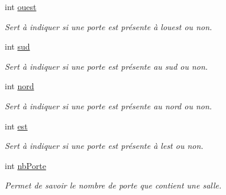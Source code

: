 \begin{DoxyCompactItemize}
\item 
\mbox{\label{structSalle_aa89ea230128f1edda9a1219cde40c861}} 
int \hyperlink{structSalle_aa89ea230128f1edda9a1219cde40c861}{ouest}
\begin{DoxyCompactList}\small\item\em Sert à indiquer si une porte est présente à l\textquotesingle{}ouest ou non. \end{DoxyCompactList}\item 
\mbox{\label{structSalle_afe3e4107ac72d3cdf7daa4a4253082e3}} 
int \hyperlink{structSalle_afe3e4107ac72d3cdf7daa4a4253082e3}{sud}
\begin{DoxyCompactList}\small\item\em Sert à indiquer si une porte est présente au sud ou non. \end{DoxyCompactList}\item 
\mbox{\label{structSalle_ad08cd27234ab13a083254eec5e4652e8}} 
int \hyperlink{structSalle_ad08cd27234ab13a083254eec5e4652e8}{nord}
\begin{DoxyCompactList}\small\item\em Sert à indiquer si une porte est présente au nord ou non. \end{DoxyCompactList}\item 
\mbox{\label{structSalle_a9cc386310fabc3fc57ffd87897445b9b}} 
int \hyperlink{structSalle_a9cc386310fabc3fc57ffd87897445b9b}{est}
\begin{DoxyCompactList}\small\item\em Sert à indiquer si une porte est présente à l\textquotesingle{}est ou non. \end{DoxyCompactList}\item 
\mbox{\label{structSalle_adc0c81ed52bd8e863da1a6a10d066904}} 
int \hyperlink{structSalle_adc0c81ed52bd8e863da1a6a10d066904}{nb\+Porte}
\begin{DoxyCompactList}\small\item\em Permet de savoir le nombre de porte que contient une salle. \end{DoxyCompactList}\item 
\mbox{\label{structSalle_aba0461bd2cd9b0708ab85bd94d1f2e8a}} 

\end{DoxyCompactItemize}
